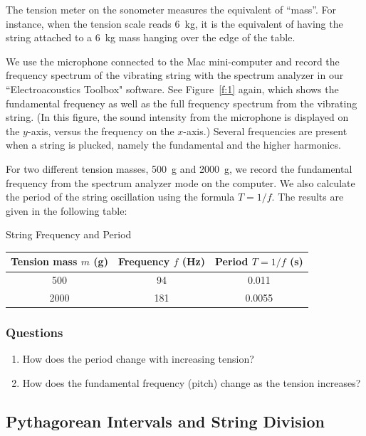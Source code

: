 \documentclass[11pt]{NSF}
\def\ben{\begin{enumerate}}
\def\een{\end{enumerate}}
\def\i{\item{}}
\begin{document}
The tension meter on the sonometer measures the equivalent of ``mass”. 
For instance, when the tension scale reads 6~kg, it is the equivalent 
of having the string attached to a 6~kg mass hanging over the edge 
of the table.

We use the microphone connected to the Mac mini-computer and 
record the frequency spectrum of the vibrating string with the 
spectrum analyzer in our ``Electroacoustics Toolbox" software. 
See Figure~\ref{f:1} again, which shows the fundamental frequency 
as well as the full frequency spectrum from the vibrating string. 
(In this figure, the sound intensity from the microphone is
displayed on the $y$-axis, versus the frequency on the $x$-axis.) 
Several frequencies are present when a string is plucked, namely 
the fundamental and the higher harmonics.

For two different tension masses, 500~g and 2000~g, we record the 
fundamental frequency from the spectrum analyzer mode on the computer.
We also calculate the period of the string oscillation using the 
formula $T= 1/f$.
The results are given in the following table:
%
\begin{table}[hbtp]
\begin{center}
String Frequency and Period\\
\begin{tabular}{| c | c | c | }
\hline
Tension mass $m$ (g) & Frequency $f$ (Hz) & Period $T=1/f$ (s) \\
\hline
500 & 94 & 0.011 \\
\hline
2000 & 181 & 0.0055 \\
\hline
\end{tabular}
\label{t:1}
\end{center}
\end{table}
%
\subsubsection*{Questions}
%
\ben
\i How does the period change with increasing tension? 

\i How does the fundamental frequency (pitch) change as the tension 
increases?
\een

\subsection{Pythagorean Intervals and String Division}
\end{document}
